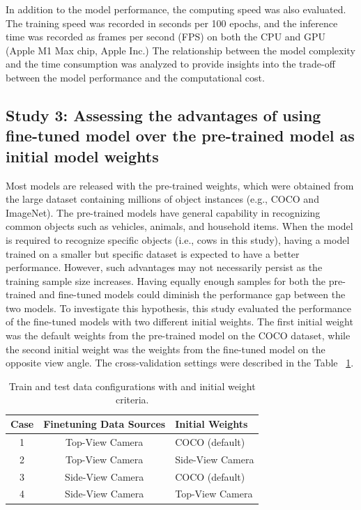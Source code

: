 In addition to the model performance, the computing speed was also evaluated. The training speed was recorded in seconds per 100 epochs, and the inference time was recorded as frames per second (FPS) on both the CPU and GPU (Apple M1 Max chip, Apple Inc.) The relationship between the model complexity and the time consumption was analyzed to provide insights into the trade-off between the model performance and the computational cost.

\subsection*{Study 3: Assessing the advantages of using fine-tuned model over the pre-trained model as initial model weights}

Most models are released with the pre-trained weights, which were obtained from the large dataset containing millions of object instances (e.g., COCO\citep{} and ImageNet\citep{}). The pre-trained models have general capability in recognizing common objects such as vehicles, animals, and household items. When the model is required to recognize specific objects (i.e., cows in this study), having a model trained on a smaller but specific dataset is expected to have a better performance. However, such advantages may not necessarily persist as the training sample size increases. Having equally enough samples for both the pre-trained and fine-tuned models could diminish the performance gap between the two models. To investigate this hypothesis, this study evaluated the performance of the fine-tuned models with two different initial weights. The first initial weight was the default weights from the pre-trained model on the COCO dataset, while the second initial weight was the weights from the fine-tuned model on the opposite view angle. The cross-validation settings were described in the Table ~\ref{tab:configuration}.

\begin{table}[h]
    \centering
    \begin{tabular}{ccl}
        \toprule
        \textbf{Case} &\textbf{Finetuning Data Sources} & \textbf{Initial Weights} \\
        \midrule
        1 &Top-View Camera & COCO (default) \\
        2 &Top-View Camera & Side-View Camera \\
        3 &Side-View Camera & COCO (default) \\
        4 &Side-View Camera & Top-View Camera \\
        \bottomrule
    \end{tabular}
    \caption{Train and test data configurations with and initial weight criteria.}
    \label{tab:configuration}
\end{table}

